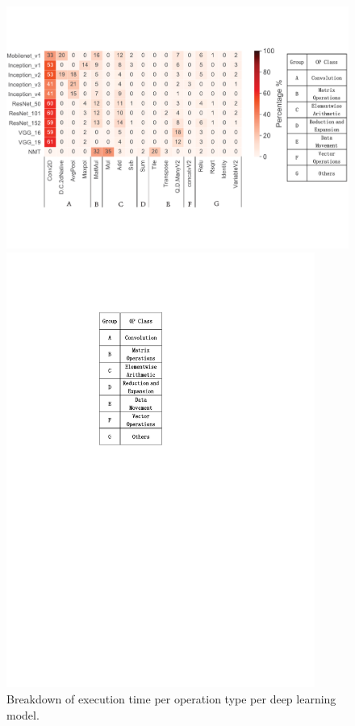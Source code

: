 
\begin{figure}
\centering
\begin{minipage}[c]{0.6\textwidth}
\centering
\includegraphics[width=1\textwidth]{figure/break11models.pdf}
\end{minipage}%
\begin{minipage}[c]{0.16\textwidth}
\centering
\includegraphics[width=0.9\textwidth]{figure/break11label1.pdf}
\end{minipage}
\caption{Breakdown of execution time per operation type per deep learning model.}
 \label{fig:breakdown11}
\end{figure}


